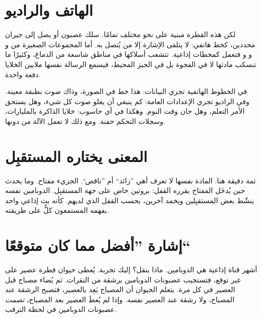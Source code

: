 \section*{الهاتف والراديو}

لكن هذه القطرة مبنية على نحو مختلف تمامًا. سلك عصبون  أو  يصل إلى جيران محددين، كخط هاتفي: لا يتلقى الإشارة إلا من يُتصل به. أما المجموعات الصغيرة من  و و و فتعمل كمحطات إذاعية. تتشعب أسلاكها في مناطق شاسعة من الدماغ، وكثيرًا ما تنسكب مادتها لا في الفجوة بل في الحيز المحيط، فيسمع الرسالة نفسها ملايين الخلايا دفعة واحدة.

في الخطوط الهاتفية تجري البيانات: هذا خط في الصورة، وذاك صوت بطبقة معينة. وفي الراديو تجري الإعدادات العامة: كم ينبغي أن يعلو صوت كل شيء، وهل يستحق الأمر التعلم، وهل حان وقت النوم. وهكذا في أي حاسوب: خلايا الذاكرة بالمليارات، وسجلات التحكم حفنة. ومع ذلك لا تعمل الآلة من دونها.

\section*{المعنى يختاره المستقبِل}

ثمة دقيقة هنا. المادة نفسها لا تعرف أهي ”زائد“ أم ”ناقص“. الجزيء مفتاح. وما يحدث حين يُدخَل المفتاح يقرره القفل: بروتين خاص على جهة المستقبِل. الدوبامين نفسه ينشّط بعض المستقبِلين ويخمد آخرين، بحسب القفل الذي لديهم. كأنه بث إذاعي واحد يفهمه المستمعون كلٌّ على طريقته.

\section*{إشارة ”أفضل مما كان متوقعًا“}

أشهر قناة إذاعية هي الدوبامين. ماذا ينقل؟ إليك تجربة. يُعطى حيوان قطرة عصير على غير توقع، فتستجيب عصبونات الدوبامين برشقة من النقرات. ثم يُضاء مصباح قبل العصير في كل مرة. يتعلم الحيوان أن المصباح يَعِد بالعصير، فتصبح الرشقة عند المصباح، ولا رشقة عند العصير نفسه. وإذا لم يُعطَ العصير بعد المصباح، \emph{تصمت} عصبونات الدوبامين في لحظة الترقب.

